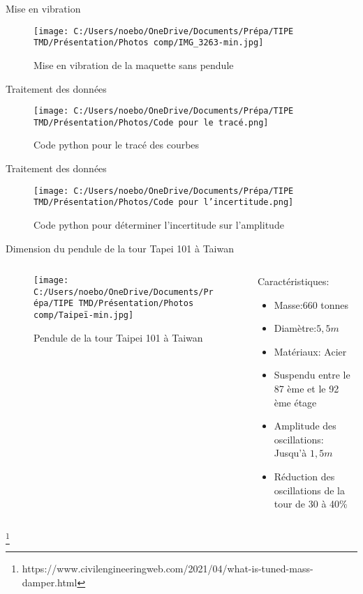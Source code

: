 \documentclass{beamer}
\begin{document}
\begin{frame}{Mise en vibration}
	\begin{figure}
		\texttt{[image: C:/Users/noebo/OneDrive/Documents/Prépa/TIPE TMD/Présentation/Photos comp/IMG\_3263-min.jpg]}
		\caption{Mise en vibration de la maquette sans pendule}
	\end{figure}
\end{frame}



\begin{frame}{Traitement des données}
	\begin{figure}
		\texttt{[image: C:/Users/noebo/OneDrive/Documents/Prépa/TIPE TMD/Présentation/Photos/Code pour le tracé.png]}
		\caption{Code python pour le tracé des courbes }
	\end{figure}
\end{frame}

\begin{frame}{Traitement des données}
	\begin{figure}
		\texttt{[image: C:/Users/noebo/OneDrive/Documents/Prépa/TIPE TMD/Présentation/Photos/Code pour l'incertitude.png]}
		\caption{Code python pour déterminer l'incertitude sur l'amplitude}
	\end{figure}
\end{frame}


\begin{frame}{Dimension du pendule de la tour Tapei 101 à Taiwan}
	\begin{columns}
		\begin{column}{0.5\textwidth}
			\begin{figure}
				\texttt{[image: C:/Users/noebo/OneDrive/Documents/Prépa/TIPE TMD/Présentation/Photos comp/Taipeï-min.jpg]}
				\caption{Pendule de la tour Taipei 101 à Taiwan}
			\end{figure}
		\end{column}
		\begin{column}{0.5\textwidth}
			Caractéristiques:
			\begin{itemize}
				\item Masse:$660$ tonnes
				\item Diamètre:$5,5 m$
				\item Matériaux: Acier
				\item Suspendu entre le 87 ème et le 92 ème étage
				\item Amplitude des oscillations: Jusqu'à $1,5m$
				\item Réduction des oscillations de la tour de 30 à 40\%
				
				
			\end{itemize}	
		\end{column}
	\end{columns}
	\footnote{\tiny https://www.civilengineeringweb.com/2021/04/what-is-tuned-mass-damper.html}
\end{frame}
\end{document}
